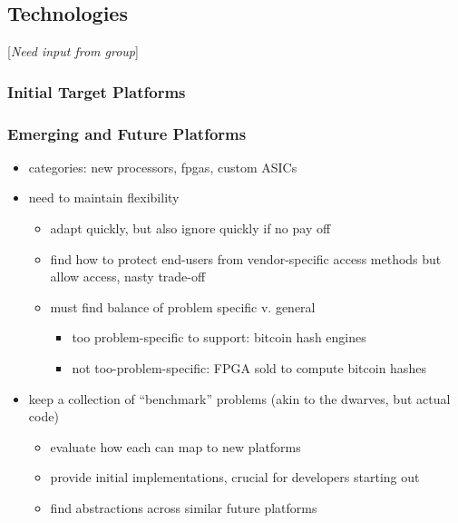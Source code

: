 \subsection{Technologies} [\textit{Need input from group}]
\subsubsection{Initial Target Platforms}

\subsubsection{Emerging and Future Platforms}

\begin{itemize}
\item categories: new processors, fpgas, custom ASICs
\item need to maintain flexibility
  \begin{itemize}
  \item adapt quickly, but also ignore quickly if no pay off
  \item find how to protect end-users from vendor-specific access methods but allow access, nasty trade-off
  \item must find balance of problem specific v. general
    \begin{itemize}
    \item too problem-specific to support: bitcoin hash engines
    \item not too-problem-specific: FPGA sold to compute bitcoin hashes
    \end{itemize}
  \end{itemize}
\item keep a collection of ``benchmark'' problems (akin to the dwarves, but actual code)
  \begin{itemize}
  \item evaluate how each can map to new platforms
  \item provide initial implementations, crucial for developers starting out
  \item find abstractions across similar future platforms
  \end{itemize}
\end{itemize}

